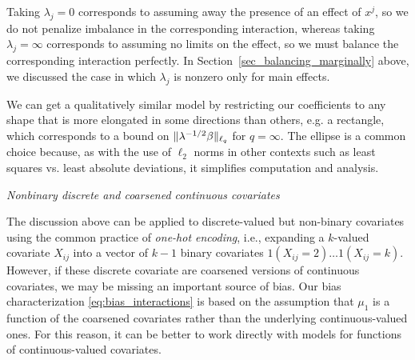 \documentclass{article}
\newcommand{\subsubsection}[1]{\par\noindent\textit{#1}\enspace}
\DeclarePairedDelimiter\norm{\lVert}{\rVert}
\theoremstyle{definition}
\newcommand{\model}{\mathcal{M}}
\newcommand{\<}{\langle}
\renewcommand{\>}{\rangle}
\newcommand\cmnt[2]{\;
{\textcolor{red}{[{\em #1 --- #2}] \;}
}}
\newcommand\eli[1]{\cmnt{#1}{Eli}}
\newcommand\dah[1]{\cmnt{#1}{Skip}}
\begin{document}
Taking $\lambda_j=0$ corresponds to assuming away the presence of an effect of $x^j$, so we do not penalize imbalance in the corresponding interaction, whereas taking $\lambda_j=\infty$ corresponds to assuming  no limits on the effect, so we must balance the corresponding interaction
perfectly. In Section~\ref{sec_balancing_marginally} above, we discussed the case in which $\lambda_j$ is nonzero only for main effects.


We can get a qualitatively similar model by restricting our coefficients to any shape that is more elongated in some directions than others, e.g. a rectangle, which corresponds to a bound on  $\norm{ \lambda^{-1/2} \beta }_{\ell_q}$ for $q=\infty$. The ellipse is a common choice because, as with the use of $\ell_2$ norms in other contexts such as least squares vs. least absolute deviations, it simplifies computation and analysis.

\subsubsection{Nonbinary discrete and coarsened continuous covariates}

The discussion above can be applied to discrete-valued but non-binary covariates
using the common practice of \emph{one-hot encoding}, i.e., expanding a $k$-valued covariate $X_{ij}$ into a vector of $k-1$ binary covariates $1(X_{ij}=2) \ldots 1(X_{ij} = k)$. However, if these discrete covariate are coarsened versions of continuous covariates, we may be missing an important source of bias. Our bias characterization \eqref{eq:bias_interactions} is based on the assumption that $\mu_1$ is a function of the coarsened covariates
rather than the underlying continuous-valued ones. For this reason, it can be better to work directly with models for functions of continuous-valued covariates.
\end{document}
